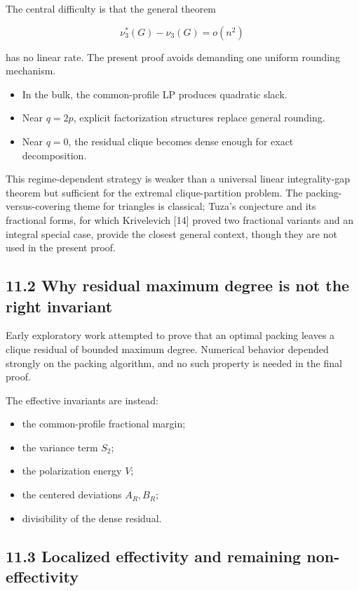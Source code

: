 \documentclass[
  11pt,
]{article}
\providecommand{\tightlist}{%
  \setlength{\itemsep}{0pt}\setlength{\parskip}{0pt}}
\begin{document}
The central difficulty is that the general theorem

\[
\nu_3^*(G)-\nu_3(G)=o(n^2)
\]

has no linear rate. The present proof avoids demanding one uniform rounding mechanism.

\begin{itemize}
\tightlist
\item
  In the bulk, the common-profile LP produces quadratic slack.
\item
  Near \(q=2p\), explicit factorization structures replace general rounding.
\item
  Near \(q=0\), the residual clique becomes dense enough for exact decomposition.
\end{itemize}

This regime-dependent strategy is weaker than a universal linear integrality-gap theorem but sufficient for the extremal clique-partition problem. The packing-versus-covering theme for triangles is classical; Tuza's conjecture and its fractional forms, for which Krivelevich {[}14{]} proved two fractional variants and an integral special case, provide the closest general context, though they are not used in the present proof.

\subsection{11.2 Why residual maximum degree is not the right invariant}\label{why-residual-maximum-degree-is-not-the-right-invariant}

Early exploratory work attempted to prove that an optimal packing leaves a clique residual of bounded maximum degree. Numerical behavior depended strongly on the packing algorithm, and no such property is needed in the final proof.

The effective invariants are instead:

\begin{itemize}
\tightlist
\item
  the common-profile fractional margin;
\item
  the variance term \(S_2\);
\item
  the polarization energy \(V\);
\item
  the centered deviations \(A_R,B_R\);
\item
  divisibility of the dense residual.
\end{itemize}

\subsection{11.3 Localized effectivity and remaining non-effectivity}\label{localized-effectivity-and-remaining-non-effectivity}
\end{document}
